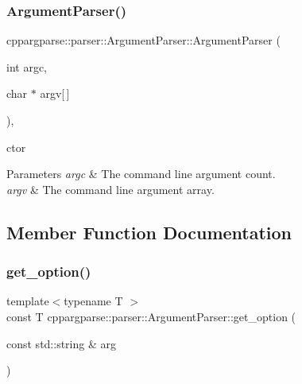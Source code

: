 \subsubsection{\texorpdfstring{Argument\+Parser()}{ArgumentParser()}}
{\footnotesize\ttfamily cppargparse\+::parser\+::\+Argument\+Parser\+::\+Argument\+Parser (\begin{DoxyParamCaption}\item[{int}]{argc,  }\item[{char $\ast$}]{argv\mbox{[}$\,$\mbox{]} }\end{DoxyParamCaption})\hspace{0.3cm}{\ttfamily [inline]}, {\ttfamily [explicit]}}



c\textquotesingle{}tor 


\begin{DoxyParams}{Parameters}
{\em argc} & The command line argument count. \\
\hline
{\em argv} & The command line argument array. \\
\hline
\end{DoxyParams}


\subsection{Member Function Documentation}
\mbox{\label{classcppargparse_1_1parser_1_1ArgumentParser_a6aa48f6269d9cad6afb455709b93a50e}} 
\subsubsection{\texorpdfstring{get\+\_\+option()}{get\_option()}\hspace{0.1cm}{\footnotesize\ttfamily [1/2]}}
{\footnotesize\ttfamily template$<$typename T $>$ \\
const T cppargparse\+::parser\+::\+Argument\+Parser\+::get\+\_\+option (\begin{DoxyParamCaption}\item[{const std\+::string \&}]{arg }\end{DoxyParamCaption})\hspace{0.3cm}{\ttfamily [inline]}}



